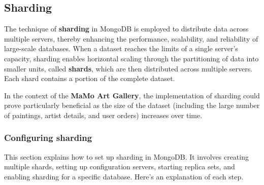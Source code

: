 \documentclass[a4paper,12pt]{article}
\begin{document}
\subsection{Sharding}
\justify

The technique of \textbf{sharding} in MongoDB is employed to distribute data across multiple servers, thereby enhancing the performance, scalability, and reliability of large-scale databases. When a dataset reaches the limits of a single server's capacity, sharding enables horizontal scaling through the partitioning of data into smaller units, called \textbf{shards}, which are then distributed across multiple servers. Each shard contains a portion of the complete dataset.

In the context of the \textbf{MaMo Art Gallery}, the implementation of sharding could prove particularly beneficial as the size of the dataset (including the large number of paintings, artist details, and user orders) increases over time. 

\subsubsection{Configuring sharding}
This section explains how to set up sharding in MongoDB. It involves creating multiple shards, setting up configuration servers, starting replica sets, and enabling sharding for a specific database. Here’s an explanation of each step.
\end{document}

